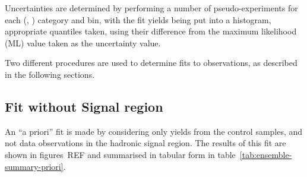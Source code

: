 Uncertainties are determined by performing a number of pseudo-experiments for
each (\nb, \nj) category and \HT bin, with the fit yields being put into a
histogram, appropriate quantiles taken, using their difference from the maximum 
likelihood (ML) value taken as the uncertainty value.

Two different procedures are used to determine fits to observations, as described
in the following sections.

\subsection{Fit without Signal region}
An ``a priori'' fit is made by considering only yields from the control samples,
and not data observations in the hadronic signal region. The results of this fit
are shown in figures~REF and summarised in tabular form in
table~\ref{tab:ensemble-summary-priori}.


